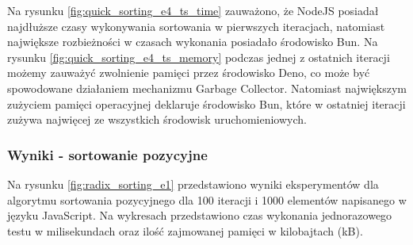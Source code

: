 Na rysunku \ref{fig:quick_sorting_e4_ts_time} zauważono, że NodeJS posiadał najdłuższe czasy wykonywania sortowania w pierwszych iteracjach, natomiast największe rozbieżności w czasach wykonania posiadało środowisko Bun. Na rysunku \ref{fig:quick_sorting_e4_ts_memory} podczas jednej z ostatnich iteracji możemy zauważyć zwolnienie pamięci przez środowisko Deno, co może być spowodowane działaniem mechanizmu Garbage Collector. Natomiast największym zużyciem pamięci operacyjnej deklaruje środowisko Bun, które w ostatniej iteracji zużywa najwięcej ze wszystkich środowisk uruchomieniowych.

\subsubsection{Wyniki - sortowanie pozycyjne}
Na rysunku \ref{fig:radix_sorting_e1} przedstawiono wyniki eksperymentów dla algorytmu sortowania pozycyjnego dla 100 iteracji i 1000 elementów napisanego w języku JavaScript. Na wykresach przedstawiono czas wykonania jednorazowego testu w milisekundach oraz ilość zajmowanej pamięci w kilobajtach (kB).

